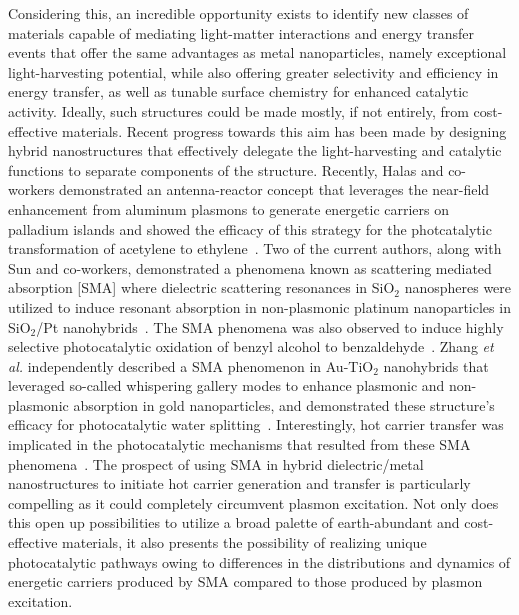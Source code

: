 \documentclass[journal=jpclcd,manuscript=article]{achemso}
\begin{document}
Considering this, an incredible opportunity exists to identify new classes
of materials capable of mediating light-matter interactions and energy transfer events that offer the same advantages as metal nanoparticles, 
namely exceptional light-harvesting potential, while also offering greater selectivity and efficiency in energy transfer, as well as tunable surface chemistry for enhanced catalytic activity.  
Ideally, such structures could be made mostly, if not entirely, from cost-effective materials.  Recent progress towards this aim has been made by designing hybrid 
nanostructures that effectively delegate the light-harvesting and catalytic functions to separate components of the structure.  Recently, Halas and co-workers 
demonstrated an antenna-reactor concept that leverages the near-field enhancement from aluminum plasmons to generate energetic carriers on 
palladium islands and showed the efficacy of this strategy for the photcatalytic transformation of acetylene to ethylene~\cite{SZZ_PNAS_2016}.
Two of the current authors, along with Sun and co-workers, demonstrated a phenomena known as scattering mediated absorption [SMA] where dielectric
scattering resonances in SiO$_2$ nanospheres were utilized to induce resonant absorption in non-plasmonic platinum nanoparticles in SiO$_2$/Pt nanohybrids~\cite{ZHX_NatPhoton_2016}.
The SMA phenomena was also observed to induce highly selective photocatalytic oxidation of benzyl alcohol to benzaldehyde~\cite{ZHX_NatPhoton_2016}.
Zhang {\it et al.} independently described a SMA phenomenon in Au-TiO$_2$ nanohybrids that leveraged so-called whispering gallery modes to 
enhance plasmonic and non-plasmonic absorption in gold nanoparticles, and demonstrated these structure's efficacy for photocatalytic water splitting~\cite{ZJM_ACSNano_2016}.
Interestingly, hot carrier transfer was implicated in the photocatalytic mechanisms that resulted from these SMA phenomena~\cite{ZHX_NatPhoton_2016,ZJM_ACSNano_2016}.
The prospect of using SMA in hybrid dielectric/metal nanostructures to initiate hot carrier generation and transfer is particularly 
compelling as it could completely circumvent plasmon excitation.  Not only does this open up possibilities to utilize a broad palette of earth-abundant and cost-effective materials, it also
presents the possibility of realizing unique photocatalytic pathways owing to differences in the distributions and dynamics of energetic carriers produced by SMA compared
to those produced by plasmon excitation.    
\end{document}
